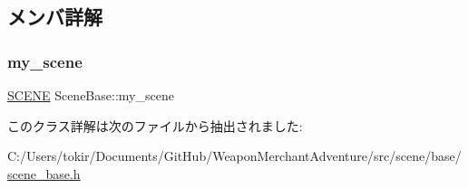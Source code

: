 \subsection{メンバ詳解}
\mbox{\label{class_scene_base_a18dcdbacfbd98f73099c3cbeb70ae3b8}} 
\subsubsection{\texorpdfstring{my\+\_\+scene}{my\_scene}}
{\footnotesize\ttfamily \mbox{\hyperlink{scene__base_8h_a24cee5343fb9d0706ead6e8601f363be}{S\+C\+E\+NE}} Scene\+Base\+::my\+\_\+scene\hspace{0.3cm}{\ttfamily [protected]}}



このクラス詳解は次のファイルから抽出されました\+:\begin{DoxyCompactItemize}
\item 
C\+:/\+Users/tokir/\+Documents/\+Git\+Hub/\+Weapon\+Merchant\+Adventure/src/scene/base/\mbox{\hyperlink{scene__base_8h}{scene\+\_\+base.\+h}}\end{DoxyCompactItemize}

